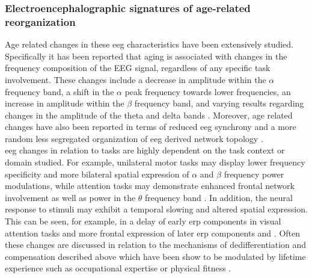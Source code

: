 \subsubsection{Electroencephalographic signatures of age-related reorganization}
Age related changes in these \gls{eeg} characteristics have been extensively studied. Specifically it has been reported that aging is associated with changes in the frequency composition of the EEG signal, regardless of any specific task involvement. These changes include a decrease in amplitude within the $\alpha$ frequency band, a shift in the $\alpha$ peak frequency towards lower frequencies, an increase in amplitude within the $\beta$ frequency band, and varying results regarding changes in the amplitude of the theta and delta bands \cite{ROSSINI2007375, Ishii2017, Courtney2021}. Moreover, age related changes have also been reported in terms of reduced \gls{eeg} synchrony and a more random less segregated organization of \gls{eeg} derived network topology \cite{Smit2012, Samogin2022}.\\
\Gls{eeg} changes in relation to tasks are highly dependent on the task context or domain studied. For example, unilateral motor tasks may display lower frequency specificity and more bilateral spatial expression of $\alpha$ and $\beta$ frequency power modulations, while attention tasks may demonstrate enhanced frontal network involvement as well as power in the $\theta$ frequency band \cite{Hong2016,Quandt2016}. In addition, the neural response to stimuli may exhibit a temporal slowing and altered spatial expression. This can be seen, for example, in a delay of early \gls{erp} components in visual attention tasks and more frontal expression of later \gls{erp} components and \cite{LI2013477, Reuter2017}.
Often these changes are discussed in relation to the mechanisms of dedifferentiation and compensation described above which have been show to be modulated by lifetime experience such as occupational expertise \cite{vieluf2018age} or physical fitness \cite{Douw2014}.\\ 
